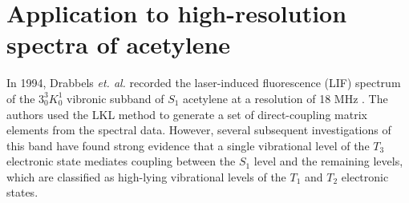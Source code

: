 






\section{Application to high-resolution spectra of acetylene}

In 1994, Drabbels \emph{et. al.} recorded the laser-induced
fluorescence (LIF) spectrum of the $3^3_0K^1_0$ vibronic subband of
$S_1$ acetylene at a resolution of 18 MHz \cite{drabbels94}.  The
authors used the LKL method to generate a set of direct-coupling
matrix elements from the spectral data.  However, several subsequent
investigations of this band have found strong evidence that a
single vibrational level of the $T_3$ electronic state mediates coupling
between the $S_1$ level and the remaining levels, which are classified
as high-lying vibrational levels of the $T_1$ and $T_2$ electronic
states.

